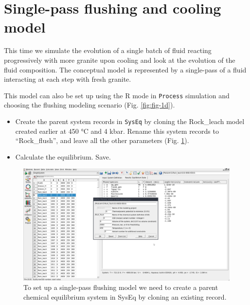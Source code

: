 \documentclass[
]{book}
\begin{document}
\hypertarget{single-pass-flushing-and-cooling-model}{%
\section{Single-pass flushing and cooling model}\label{single-pass-flushing-and-cooling-model}}

This time we simulate the evolution of a single batch of fluid reacting progressively with more granite upon cooling and look at the evolution of the fluid composition. The conceptual model is represented by a single-pass of a fluid interacting at each step with fresh granite.

This model can also be set up using the R mode in \texttt{Process} simulation and choosing the flushing modeling scenario (Fig. \ref{fig:fig-1d}).

\begin{itemize}
\item
  Create the parent system records in \texttt{SysEq} by cloning the Rock\_leach model created earlier at 450 °C and 4 kbar. Rename this system records to ``Rock\_flush'', and leave all the other parameters (Fig. \ref{fig:fig-14d}).
\item
  Calculate the equilibrium. Save.
\end{itemize}

\begin{figure}
\includegraphics[width=1\linewidth]{figures/module4/fig-14} \caption{To set up a single-pass flushing model we need to create a parent chemical equilibrium system in SysEq by cloning an existing record.}\label{fig:fig-14d}
\end{figure}
\end{document}
